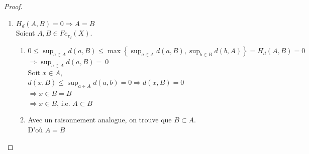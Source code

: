 \documentclass[11pt]{report}
\theoremstyle{styletheorem}
\theoremstyle{styledef}
\theoremstyle{remark}
\begin{document}
\begin{proof}
\begin{enumerate}
		\begin{enumerate}
			\item Si $a \in A,\ b \in B,\ c \in C$, avec d une semi-métrique, on a : \\ $d(a,c) \leq d(a,b) + d(b,c)$\\
			$d(a,b) \leq \max \left\lbrace \sup_{a \in A} d(a,B), \sup_{b \in B} d(b,A) \right\rbrace = H_d (A,B)$ 
			et \\  $ d(b,c) \leq \max \left\lbrace \sup_{b \in B} d(b,C), \sup_{c \in C} d(c,B) \right\rbrace = H_d (B,C)$\\
			$\Rightarrow d(a,b) + d(b,c) \leq  H_d (A,B) + H_d (B,C)$\\
			$\Rightarrow d(a,c) \leq d(a,b) + d(b,c) \leq H_{d} (A,B) + H_{d} (B,C)$\\
			$\Rightarrow d(a,c) \leq H_{d} (A,B) + H_{d} (B,C)$ $\forall a \in A$ $\forall c \in C$\label{idem1}
			\item En raisonnant de la même façon, on a aussi $d(c,a) \leq H_{d} (A,B) + ~H_{d} (B,C)$ \label{idem2}\\
			De 4(a) et 4(b), on obtient : \\
			$H_d (A,C) = \max \left\lbrace \sup_{a \in A} d(a,C), \sup_{c \in C} d(c,A) \right\rbrace \leq H_{d} (A,B) + H_{d} (B,C) $\\ \\
			D'où $H_d (A,C) \leq H_d (A,B) + H_d (B,C) $
		\end{enumerate}
		\item $H_d (A,B) = 0 \Rightarrow A = B$\\ Soient $A,B \in Fe_{ \tau_d} (X)$.
		\begin{enumerate}
			\item $0 \leq \sup_{a \in A} d(a,B) \leq \max \left\lbrace \sup_{a \in A} d(a,B), \sup_{b \in B} d(b,A)\right\rbrace = H_{d} (A,B) = 0 $\\ $\Rightarrow \sup_{a \in A} d(a,B) = ~0 $\\
			
			Soit $ x \in A$, \\
			$d(x,B) \leq \sup_{a \in A} d(a,b) = 0 \Rightarrow d(x,B) = 0$ \\ $\Rightarrow x \in \overline{B} = B  $\\ $\Rightarrow x \in B$, i.e. $A \subset B$
			\item Avec un raisonnement analogue, on trouve que $B \subset A$.\\
			D'où $A = B$
		\end{enumerate}
	\end{enumerate}
\end{proof}
\end{document}
